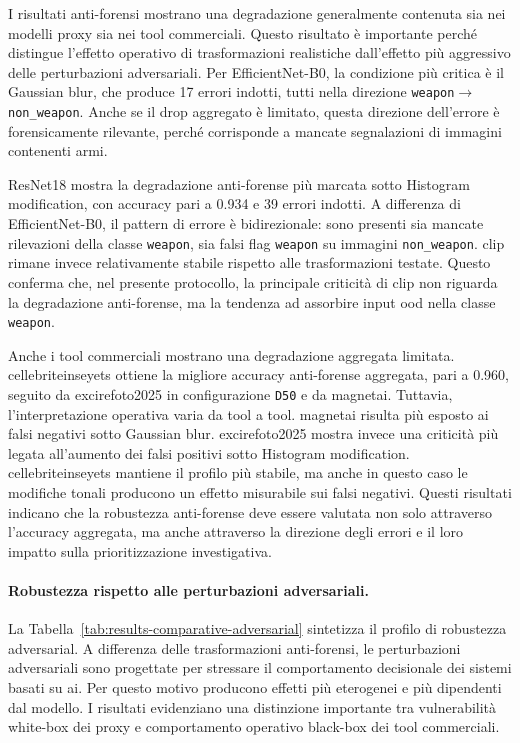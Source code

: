I risultati anti-forensi mostrano una degradazione generalmente contenuta sia
nei modelli proxy sia nei tool commerciali. Questo risultato è importante perché
distingue l'effetto operativo di trasformazioni realistiche dall'effetto più
aggressivo delle perturbazioni adversariali. Per EfficientNet-B0, la condizione
più critica è il Gaussian blur, che produce 17 errori indotti, tutti nella
direzione \texttt{weapon}\(\rightarrow\)\texttt{non\_weapon}. Anche se il drop
aggregato è limitato, questa direzione dell'errore è forensicamente rilevante,
perché corrisponde a mancate segnalazioni di immagini contenenti armi.

ResNet18 mostra la degradazione anti-forense più marcata sotto Histogram
modification, con accuracy pari a 0.934 e 39 errori indotti. A differenza di
EfficientNet-B0, il pattern di errore è bidirezionale: sono presenti sia mancate
rilevazioni della classe \texttt{weapon}, sia falsi flag \texttt{weapon} su
immagini \texttt{non\_weapon}. \gls{clip} rimane invece relativamente stabile
rispetto alle trasformazioni testate. Questo conferma che, nel presente
protocollo, la principale criticità di \gls{clip} non riguarda la degradazione
anti-forense, ma la tendenza ad assorbire input \gls{ood} nella classe
\texttt{weapon}.

Anche i tool commerciali mostrano una degradazione aggregata limitata.
\gls{cellebriteinseyets} ottiene la migliore accuracy anti-forense aggregata,
pari a 0.960, seguito da \gls{excirefoto2025} in configurazione \texttt{D50} e
da \gls{magnetai}. Tuttavia, l'interpretazione operativa varia da tool a tool.
\gls{magnetai} risulta più esposto ai falsi negativi sotto Gaussian blur.
\gls{excirefoto2025} mostra invece una criticità più legata all'aumento dei
falsi positivi sotto Histogram modification. \gls{cellebriteinseyets} mantiene
il profilo più stabile, ma anche in questo caso le modifiche tonali producono un
effetto misurabile sui falsi negativi. Questi risultati indicano che la
robustezza anti-forense deve essere valutata non solo attraverso l'accuracy
aggregata, ma anche attraverso la direzione degli errori e il loro impatto sulla
prioritizzazione investigativa.

\paragraph{Robustezza rispetto alle perturbazioni adversariali.}

La Tabella~\ref{tab:results-comparative-adversarial} sintetizza il profilo di
robustezza adversarial. A differenza delle trasformazioni anti-forensi, le
perturbazioni adversariali sono progettate per stressare il comportamento
decisionale dei sistemi basati su \gls{ai}. Per questo motivo producono effetti
più eterogenei e più dipendenti dal modello. I risultati evidenziano una
distinzione importante tra vulnerabilità white-box dei proxy e comportamento
operativo black-box dei tool commerciali.


